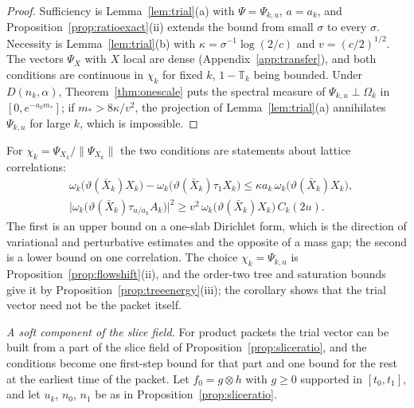 \documentclass[aps,prd,twocolumn,superscriptaddress,nofootinbib,longbibliography,floatfix,amsmath,amssymb,10pt]{revtex4-2}
\theoremstyle{definition}
\theoremstyle{remark}
\begin{document}
\begin{proof}
Sufficiency is Lemma~\ref{lem:trial}(a) with $\Psi=\Psi_{k,u}$, $a=a_k$, and
Proposition~\ref{prop:ratioexact}(ii) extends the bound from small $\sigma$ to
every $\sigma$. Necessity is Lemma~\ref{lem:trial}(b) with
$\kappa=\sigma^{-1}\log(2/c)$ and $v=(c/2)^{1/2}$. The vectors $\Psi_X$ with
$X$ local are dense (Appendix~\ref{app:transfer}), and both conditions are
continuous in $\chi_k$ for fixed $k$, $1-\mathbb T_k$ being bounded. Under
$D(n_k,\alpha)$, Theorem~\ref{thm:onescale} puts the spectral measure of
$\Psi_{k,u}\perp\Omega_k$ in $[0,e^{-a_km_*}]$; if $m_*>8\kappa/v^2$, the
projection of Lemma~\ref{lem:trial}(a) annihilates $\Psi_{k,u}$ for large $k$,
which is impossible.
\end{proof}

For $\chi_k=\Psi_{X_k}/\|\Psi_{X_k}\|$ the two conditions are statements about
lattice correlations:
\[
\begin{split}
&\omega_k\bigl(\vartheta(\bar X_k)X_k\bigr)-\omega_k\bigl(\vartheta(\bar
X_k)\tau_1X_k\bigr)\le\kappa a_k\,\omega_k\bigl(\vartheta(\bar X_k)X_k\bigr),\\
&\bigl|\omega_k\bigl(\vartheta(\bar X_k)\tau_{u/a_k}A_k\bigr)\bigr|^2\ge v^2\,
\omega_k\bigl(\vartheta(\bar X_k)X_k\bigr)\,C_k(2u).
\end{split}
\]
The first is an upper bound on a one-slab Dirichlet form, which is the
direction of variational and perturbative estimates and the opposite of a
mass gap; the second is a lower bound on one correlation. The choice
$\chi_k=\Psi_{k,u}$ is Proposition~\ref{prop:flowshift}(ii), and the order-two
tree and saturation bounds give it by Proposition~\ref{prop:treeenergy}(iii);
the corollary shows that the trial vector need not be the packet itself.

\emph{A soft component of the slice field.} For product packets the trial
vector can be built from a part of the slice field of
Proposition~\ref{prop:sliceratio}, and the conditions become one first-step
bound for that part and one bound for the rest at the earliest time of the
packet. Let $f_0=g\otimes h$ with $g\ge0$ supported in $[t_0,t_1]$, and let
$u_k$, $n_0$, $n_1$ be as in Proposition~\ref{prop:sliceratio}.
\end{document}
